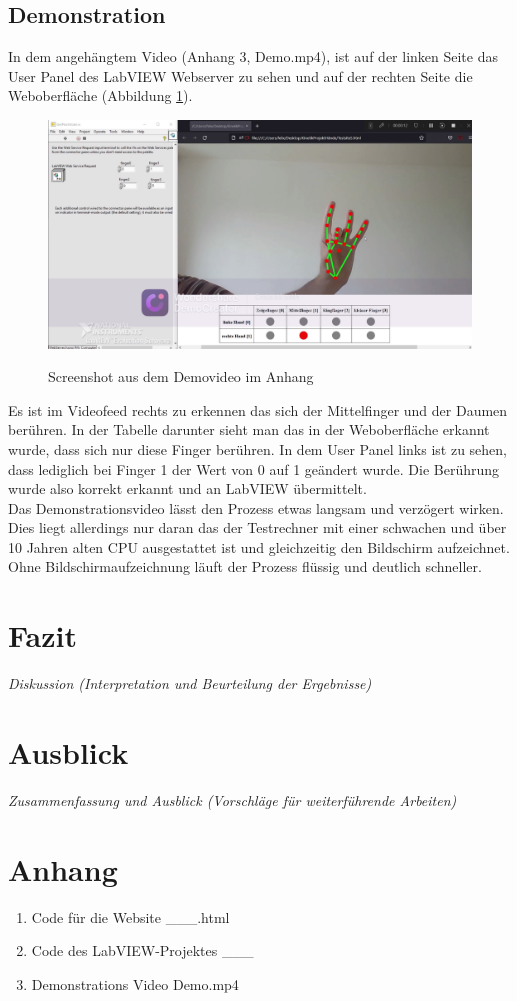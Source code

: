 \documentclass[a4paper,12pt,final]{article} %
\numberwithin{equation}{section} %
\numberwithin{figure}{section} %
\numberwithin{table}{section} %
\begin{document}
\subsection{Demonstration}
In dem angehängtem Video (Anhang 3, Demo.mp4), ist auf der linken Seite das User Panel des LabVIEW Webserver zu sehen und auf der rechten Seite die Weboberfläche (Abbildung \ref{fig:ScreenshotVideo}).
\begin{figure}[H]
	\begin{center}
		\includegraphics[width=12cm]{Bilder/ScreenshotVideo.png}
		\label{fig:ScreenshotVideo}
		\caption{Screenshot aus dem Demovideo im Anhang}
	\end{center}
\end{figure}
Es ist im Videofeed rechts zu erkennen das sich der Mittelfinger und der Daumen berühren. In der Tabelle darunter sieht man das in der Weboberfläche erkannt wurde, dass sich nur diese Finger berühren.
In dem User Panel links ist zu sehen, dass lediglich bei Finger 1 der Wert von 0 auf 1 geändert wurde. Die Berührung wurde also korrekt erkannt und an LabVIEW übermittelt.\\
Das Demonstrationsvideo lässt den Prozess etwas langsam und verzögert wirken. Dies liegt allerdings nur daran das der Testrechner mit einer schwachen und über 10 Jahren alten CPU ausgestattet ist und gleichzeitig den Bildschirm aufzeichnet. 
Ohne Bild\-schirm\-auf\-zeich\-nung läuft der Prozess flüssig und deutlich schneller. 
\newpage
\section{Fazit}
\emph{Diskussion (Interpretation und Beurteilung der Ergebnisse)}
\newpage
\section{Ausblick}
\emph{Zusammenfassung und Ausblick (Vorschläge für weiterführende Arbeiten)}
\newpage
{}
{} %
\printbibliography  %
\newpage
\section*{Anhang} 
\begin{enumerate}
	\item Code für die Website \_\_\_.html
	\item Code des LabVIEW-Projektes \_\_\_
	\item Demonstrations Video Demo.mp4
\end{enumerate}
\newpage
\end{document}
